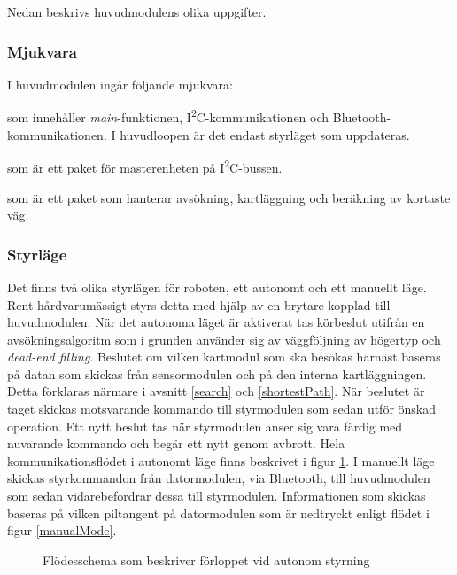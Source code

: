 \documentclass[11pt]{article}
\begin{document}
\begin{flushleft}
Nedan beskrivs huvudmodulens olika uppgifter.

\subsubsection{Mjukvara}
I huvudmodulen ingår följande mjukvara:

\begin{description}[style=unboxed, leftmargin=0cm]
  \item[huvudMain.c] som innehåller \textit{main}-funktionen, I\textsuperscript{2}C-kommunikationen och Bluetooth\textsuperscript{\circledR}-kommunikationen. I huvudloopen är det endast styrläget som uppdateras.
  \item[I2C\_master.h] som är ett paket för masterenheten på I\textsuperscript{2}C-bussen.
  \item[searchPath.h] som är ett paket som hanterar avsökning, kartläggning och beräkning av kortaste väg.
\end{description}

\subsubsection{Styrläge}
Det finns två olika styrlägen för roboten, ett autonomt och ett manuellt läge. Rent hårdvarumässigt styrs detta med hjälp av en brytare kopplad till huvudmodulen. När det autonoma läget är aktiverat tas körbeslut utifrån en avsökningsalgoritm som i grunden använder sig av väggföljning av högertyp och \emph{dead-end filling}. Beslutet om vilken kartmodul som ska besökas härnäst baseras på datan som skickas från sensormodulen och på den interna kartläggningen. Detta förklaras närmare i avsnitt \ref{search} och \ref{shortestPath}. När beslutet är taget skickas motsvarande kommando till styrmodulen som sedan utför önskad operation. Ett nytt beslut tas när styrmodulen anser sig vara färdig med nuvarande kommando och begär ett nytt genom avbrott. Hela kommunikationsflödet i autonomt läge finns beskrivet i figur \ref{autonomousMode}. I manuellt läge skickas styrkommandon från datormodulen, via Bluetooth\textsuperscript{\circledR}, till huvudmodulen som sedan vidarebefordrar dessa till styrmodulen. Informationen som skickas baseras på vilken piltangent på datormodulen som är nedtryckt enligt flödet i figur \ref{manualMode}.

\begin{figure}[htbp]
\centering
\noindent\resizebox{0.9\linewidth}{!}{
	}
	\cprotect\caption{Flödesschema som beskriver förloppet vid autonom styrning \label{autonomousMode}}	
\end{figure}


\end{flushleft}
\end{document}

